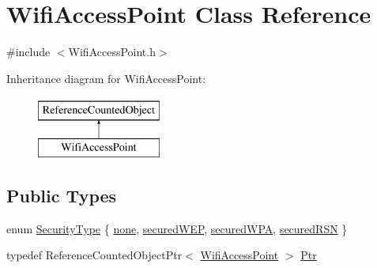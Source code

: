 \hypertarget{classWifiAccessPoint}{}\section{Wifi\+Access\+Point Class Reference}
\label{classWifiAccessPoint}


{\ttfamily \#include $<$Wifi\+Access\+Point.\+h$>$}

Inheritance diagram for Wifi\+Access\+Point\+:\begin{figure}[H]
\begin{center}
\leavevmode
\includegraphics[height=2.000000cm]{classWifiAccessPoint}
\end{center}
\end{figure}
\subsection*{Public Types}
\begin{DoxyCompactItemize}
\item 
enum \mbox{\hyperlink{classWifiAccessPoint_aaad51b8e8ee5297faa66386c597fae92}{Security\+Type}} \{ \mbox{\hyperlink{classWifiAccessPoint_aaad51b8e8ee5297faa66386c597fae92a8904f566d2ed04326bce728836f58c79}{none}}, 
\mbox{\hyperlink{classWifiAccessPoint_aaad51b8e8ee5297faa66386c597fae92aa8f86a7c4a28e24edc8da33b1f3414f0}{secured\+W\+EP}}, 
\mbox{\hyperlink{classWifiAccessPoint_aaad51b8e8ee5297faa66386c597fae92a8cef669bb5b72eeb7f343f69c67fa558}{secured\+W\+PA}}, 
\mbox{\hyperlink{classWifiAccessPoint_aaad51b8e8ee5297faa66386c597fae92aa3ed1d0af64d4e5d652f688501e9143a}{secured\+R\+SN}}
 \}
\item 
typedef Reference\+Counted\+Object\+Ptr$<$ \mbox{\hyperlink{classWifiAccessPoint}{Wifi\+Access\+Point}} $>$ \mbox{\hyperlink{classWifiAccessPoint_ad18977f884076774803027efbaa131a0}{Ptr}}
\end{DoxyCompactItemize}
